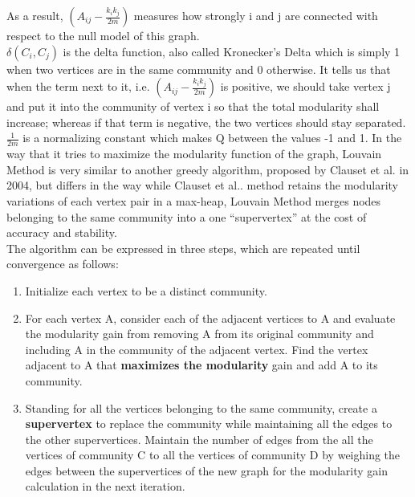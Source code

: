 \documentclass[10pt]{article}
\begin{document}
As a result, $\left( A_{ij} - \frac{k_i k_j}{2m} \right)$ measures how strongly i and j are connected with respect to the null model of this graph. \\

$\delta \left( C_i, C_j\right)$ is the delta function, also called Kronecker’s Delta which is simply 1 when two vertices are
in the same community and 0 otherwise. It tells us that when the term next to it, i.e. $\left( A_{ij} - \frac{k_i k_j}{2m} \right)$ is positive, we should take vertex j and put it into the community of vertex i so that the total modularity shall increase; whereas if that term is negative, the two vertices should stay separated. \\

$\frac{1}{2m}$ is a normalizing constant which makes Q between the values -1 and 1.
In the way that it tries to maximize the modularity function of the graph, Louvain Method is very similar to another greedy algorithm, proposed by Clauset et al. in 2004, but differs in the way while Clauset et al.\cite{clauset}. method retains the modularity variations of each vertex pair in a max-heap, Louvain Method merges nodes belonging to the same community into a one “supervertex” at the cost of accuracy and stability\cite{blondel}. \\

The algorithm can be expressed in three steps, which are repeated until convergence as follows: \\

\begin{enumerate}
\item Initialize each vertex to be a distinct community.
\item For each vertex A, consider each of the adjacent vertices to A and evaluate the modularity gain from removing A from its original community and including A in the community of the adjacent vertex. Find the vertex adjacent to A that \textbf{maximizes the modularity} gain and add A to its community.
\item Standing for all the vertices belonging to the same community, create a \textbf{supervertex} to replace the community while maintaining all the edges to the other supervertices. Maintain the number of edges from the all the vertices of community C to all the vertices of community D by weighing the edges between the supervertices of the new graph for the modularity gain calculation in the next iteration. 
\end{enumerate}
\end{document}
